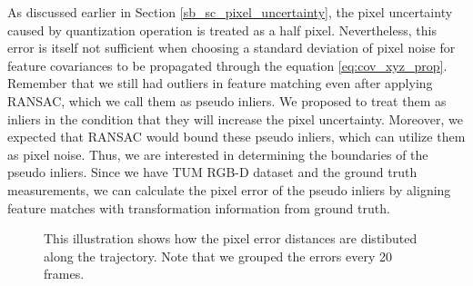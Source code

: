 \documentclass[a4paper]{report}
\numberwithin{figure}{section}
\begin{document}
As discussed earlier in Section \ref{sb_sc_pixel_uncertainty}, the pixel 
uncertainty caused by quantization operation is treated as a half pixel.  
Nevertheless, this error is itself not sufficient when choosing a standard 
deviation of pixel noise for feature covariances to be propagated through the 
equation \eqref{eq:cov_xyz_prop}. Remember that we still had outliers in 
feature matching even after applying RANSAC, which we call them as pseudo 
inliers. We proposed to treat them as inliers in the condition that they will 
increase the pixel uncertainty.  Moreover, we expected that RANSAC would bound 
these pseudo inliers, which can utilize them as pixel noise. Thus, we are 
interested in determining the boundaries of the pseudo inliers.  Since we have 
TUM RGB-D dataset and the ground truth measurements, we can calculate the 
pixel error of the pseudo inliers by aligning feature matches with 
transformation information from ground truth.


\begin{figure}[H]  \caption[Time-based Histogram of Pixel Errors]{ This illustration shows how the pixel error distances are distibuted along the trajectory. Note that we grouped the errors every 20 frames.} \label{fig:time_based_hist_pix_err} \end{figure}
\end{document}
